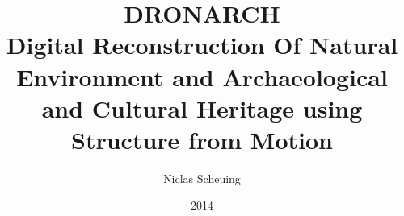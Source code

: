 \documentclass[a4paper]{report}
\begin{document}
	
	\title{\huge{DRONARCH} \\ \vspace*{1cm}\normalsize{Digital Reconstruction Of Natural Environment and Archaeological and Cultural Heritage using Structure from Motion}}
	
	\author{Niclas Scheuing}
	\date{2014}
	
	 \setcounter{page}{1}
	\maketitle
	\tableofcontents
	\clearpage
	 \setcounter{page}{1}
	
	
	
	
	
	
	
	
	\begin{appendix}
				
	\end{appendix}
	
	\listoffigures
	
%		
%	
	
	\nocite{*}
	
	

	
\end{document}
